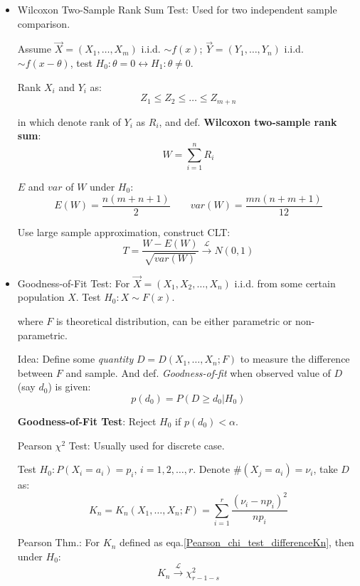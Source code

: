 \begin{itemize}
        \item Wilcoxon Two-Sample Rank Sum Test: Used for two independent sample comparison.
        
        Assume $\vec{X}=(X_1,\ldots,X_m)$ i.i.d. $\sim f(x)$; $\vec{Y}=(Y_1,\ldots,Y_n)$ i.i.d. $\sim f(x-\theta)$, test $H_0:\theta=0\longleftrightarrow H_1:\theta\neq 0$.

        Rank $X_i$ and $Y_i$ as:
        \[
            Z_1\leq Z_2\leq\ldots\leq Z_{m+n}
        \]

        in which denote rank of $Y_i$ as $R_i$, and def. \textbf{Wilcoxon two-sample rank sum}:
        \[W=\sum_{i=1}^n R_i\]

        $E$ and $var$ of $W$ under $H_0$:
\[E(W)=\frac{n(m+n+1)}{2}\qquad var(W)=\frac{mn(n+m+1)}{12}\]

        Use large sample approximation, construct CLT:
        \[
            T=\frac{W-E(W)}{\sqrt{var(W)}}\xrightarrow[]{\mathscr{L}}N(0,1)
        \]







        \item Goodness-of-Fit Test: For $\vec{X}=(X_1,X_2,\ldots,X_n)$ i.i.d. from some certain population $X$. Test $H_0:X\sim F(x)$.
        
        where $F$ is theoretical distribution, can be either parametric or non-parametric.

        Idea: Define some \textit{quantity} $D=D(X_1,\ldots,X_n;F)$ to measure the difference between $F$ and sample. And def. \textit{Goodness-of-fit} when observed value of $D$ (say $d_0$) is given:
        \[p(d_0)=P(D\geq d_0|H_0)\]

        \textbf{Goodness-of-Fit Test}: Reject $H_0$ if $p(d_0)<\alpha$.


            Pearson $\chi^2$ Test: Usually used for discrete case. 
            
            Test $H_0:P(X_i=a_i)=p_i,\, i=1,2,\ldots,r$. Denote $\#(X_j=a_i)=\nu_i$, take $D$ as:
            \begin{equation}\label{Pearson_chi_test_differenceKn}
                K_n=K_n(X_1,\ldots,X_n;F)=\sum_{i=1}^r\frac{(\nu_i-np_i)^2}{np_i}
            \end{equation}

            Pearson Thm.: For $K_n$ defined as eqa.\ref{Pearson_chi_test_differenceKn}, then under $H_0$:
            \[
                K_n\xrightarrow[]{\mathscr{L}}\chi^2_{r-1-s}
            \] 


\end{itemize}
